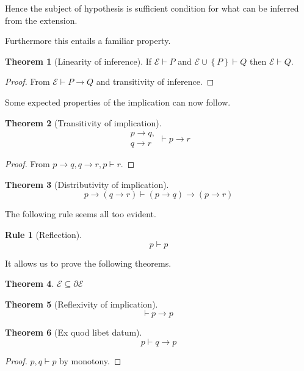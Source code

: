 \documentclass{amsbook}
\newcommand{\setsm}[1]{\left\{#1\right\}}
\newcommand{\infers}{\mathrel\vdash}
\newcommand{\theorem}{\mathord\vdash\medspace}
\newcommand{\then}{\mathrel\rightarrow}
\theoremstyle{definition}
\newtheorem{subrule}[frule]{Rule}
\newtheorem{thm}{Theorem}[section]
\begin{document}
Hence the subject of hypothesis is sufficient condition for what can be inferred from the extension.

Furthermore this entails a familiar property.

\begin{thm}[Linearity of inference]
    If $\mathcal E \infers P$ and $\mathcal E \cup \setsm P \infers Q$ then $\mathcal E \infers Q$.
    \begin{proof}
        From $\mathcal E \infers P \then Q$ and transitivity of inference.
    \end{proof}
\end{thm}

Some expected properties of the implication can now follow.

\begin{thm}[Transitivity of implication]
    $$\begin{aligned}
            p \then q, \\
            q \then r
        \end{aligned} \infers p \then r$$
    \begin{proof}
        From $p \then q, q \then r, p \infers r$.
    \end{proof}
\end{thm}

\begin{thm}[Distributivity of implication]
    $$p \then (q \then r) \infers (p \then q) \then (p \then r)$$
\end{thm}

The following rule seems all too evident.

\begin{subrule}[Reflection]
    $$p \infers p$$
\end{subrule}

It allows us to prove the following theorems.

\begin{thm}
    $\mathcal E \subseteq \partial\mathcal E$
\end{thm}

\begin{thm}[Reflexivity of implication]
    $$\theorem p \then p$$
\end{thm}

\begin{thm}[Ex quod libet datum]
    $$p \infers q \then p$$
    \begin{proof}
        $p, q \infers p$ by monotony.
    \end{proof}
\end{thm}
\end{document}

